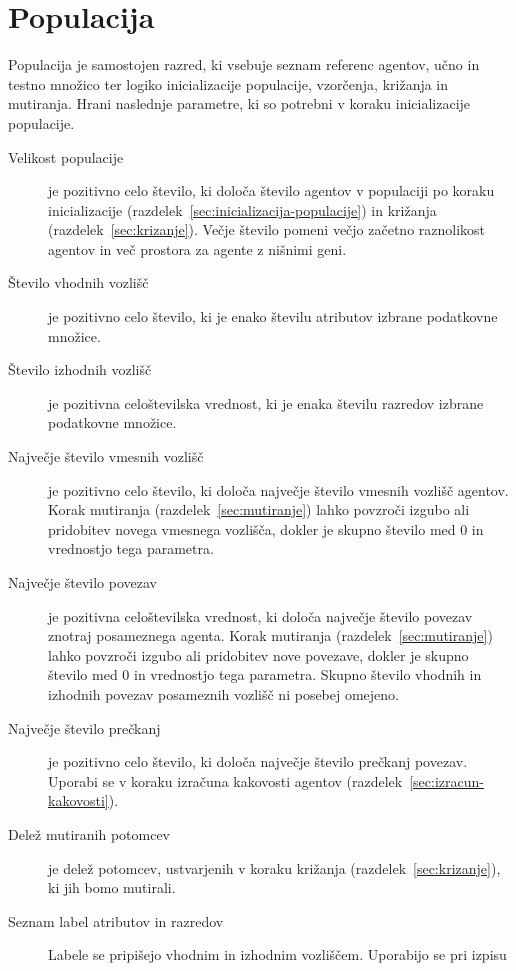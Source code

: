 \documentclass[a4paper,12pt,openright]{book}
\begin{document}
    \section{Populacija}\label{sec:populacija}
    Populacija je samostojen razred, ki vsebuje seznam referenc agentov, učno in testno množico ter logiko inicializacije populacije, vzorčenja,
    križanja in mutiranja.
    Hrani naslednje parametre, ki so potrebni v koraku inicializacije populacije.
    \begin{description}
        \item[Velikost populacije]{je pozitivno celo število, ki določa število agentov v populaciji po koraku inicializacije
        (razdelek~\ref{sec:inicializacija-populacije}) in križanja (razdelek~\ref{sec:krizanje}). Večje število pomeni večjo začetno raznolikost
        agentov in več prostora za agente z nišnimi geni.}
        \item[Število vhodnih vozlišč]{je pozitivno celo število, ki je enako šte\-vi\-lu atributov izbrane podatkovne množice.}
        \item[Število izhodnih vozlišč]{je pozitivna celoštevilska vrednost, ki je enaka šte\-vi\-lu razredov izbrane podatkovne množice.}
        \item[Največje število vmesnih vozlišč]{je pozitivno celo število, ki do\-lo\-ča naj\-ve\-čje število vmesnih vozlišč agentov.
        Korak mutiranja (razdelek~\ref{sec:mutiranje}) lahko povzroči izgubo ali pridobitev novega vmesnega
        vozlišča, dokler je skupno število med 0 in vrednostjo tega parametra.}
        \item[Največje število povezav]{je pozitivna celoštevilska vrednost, ki določa naj\-ve\-čje število povezav
        znotraj posameznega agenta. Korak mutiranja (razdelek~\ref{sec:mutiranje}) lahko povzroči izgubo ali pridobitev nove povezave,
        dokler je skupno število med 0 in vrednostjo tega parametra. Skupno število vhodnih in izhodnih povezav posameznih vozlišč ni posebej omejeno. }
        \item[Največje število prečkanj]{je pozitivno celo število, ki določa največje šte\-vi\-lo prečkanj povezav.
        Uporabi se v koraku izračuna kakovosti agentov (razdelek~\ref{sec:izracun-kakovosti}).}
        \item[Delež mutiranih potomcev]{je delež potomcev, ustvarjenih v koraku kri\-žan\-ja (razdelek~\ref{sec:krizanje}), ki jih bomo
        mutirali.}
        \item[Seznam label atributov in razredov]{Labele se pripišejo vhodnim in izhodnim vozliščem. Uporabijo se pri izpisu
}
\end{description}
\end{document}
